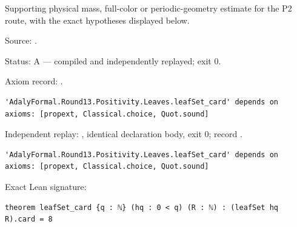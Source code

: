 \begin{theorem}[bp-445]
\label{bp-445}
\leanok
Supporting physical mass, full-color or periodic-geometry estimate for the P2 route, with the exact hypotheses displayed below.

\par Source: \texttt{}.
\par Status: A — compiled and independently replayed; exit 0.
\par Axiom record: \texttt{}.
\begin{verbatim}
'AdalyFormal.Round13.Positivity.Leaves.leafSet_card' depends on axioms: [propext, Classical.choice, Quot.sound]
\end{verbatim}
\par Independent replay: \texttt{}, identical declaration body, exit 0; record \texttt{}.
\begin{verbatim}
'AdalyFormal.Round13.Positivity.Leaves.leafSet_card' depends on axioms: [propext, Classical.choice, Quot.sound]
\end{verbatim}
\par Exact Lean signature:
\begin{verbatim}
theorem leafSet_card {q : ℕ} (hq : 0 < q) (R : ℕ) : (leafSet hq R).card = 8
\end{verbatim}
\end{theorem}


